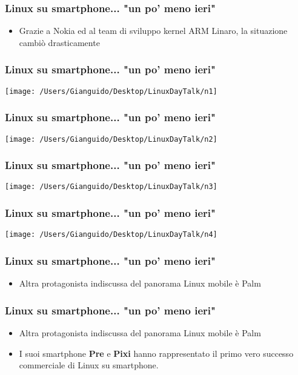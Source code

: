 \documentclass[12pt]{beamer}
\begin{document}
\begin{frame}
\frametitle{Linux su smartphone... "un po' meno ieri"}
\begin{itemize}
\item Grazie a Nokia ed al team di sviluppo kernel ARM Linaro, la situazione cambiò drasticamente
\end{itemize}
\end{frame}

\begin{frame}
\frametitle{Linux su smartphone... "un po' meno ieri"}
\begin{center}
\texttt{[image: /Users/Gianguido/Desktop/LinuxDayTalk/n1]}
\end{center}
\end{frame}

\begin{frame}
\frametitle{Linux su smartphone... "un po' meno ieri"}
\begin{center}
\texttt{[image: /Users/Gianguido/Desktop/LinuxDayTalk/n2]}
\end{center}		
\end{frame}

\begin{frame}
\frametitle{Linux su smartphone... "un po' meno ieri"}
\begin{center}
\texttt{[image: /Users/Gianguido/Desktop/LinuxDayTalk/n3]}
\end{center}			
\end{frame}

\begin{frame}
\frametitle{Linux su smartphone... "un po' meno ieri"}
\begin{center}
\texttt{[image: /Users/Gianguido/Desktop/LinuxDayTalk/n4]}
\end{center}				
\end{frame}

\begin{frame}
\frametitle{Linux su smartphone... "un po' meno ieri"}
\begin{itemize}
\item Altra protagonista indiscussa del panorama Linux mobile è Palm
\end{itemize}
\end{frame}

\begin{frame}
\frametitle{Linux su smartphone... "un po' meno ieri"}
\begin{itemize}
\item Altra protagonista indiscussa del panorama Linux mobile è Palm
\item I suoi smartphone \textbf{Pre} e \textbf{Pixi} hanno rappresentato il primo vero successo commerciale di Linux su smartphone.
\end{itemize}
\end{frame}
\end{document}
